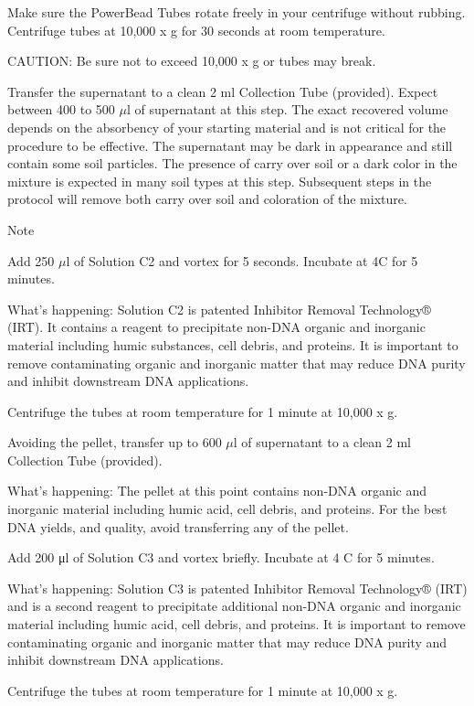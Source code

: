 \documentclass[12pt]{../SOP3_alpha}
\begin{document}
\NP Make sure the PowerBead Tubes rotate freely in your centrifuge without rubbing. Centrifuge tubes at 10,000 x g for 30 seconds at room temperature.

CAUTION: Be sure not to exceed 10,000 x g or tubes may break.

\NP Transfer the supernatant to a clean 2 ml Collection Tube (provided). Expect between 400 to 500 $\mu$l of supernatant at this step. The exact recovered volume depends on the absorbency of
your starting material and is not critical for the procedure to be effective. The supernatant may be dark in appearance and still contain some soil particles. The presence of carry over soil or a dark color in the mixture is expected in many
soil types at this step. Subsequent steps in the protocol will remove both carry over soil and coloration of the mixture.

Note

\NP Add 250 $\mu$l of Solution C2 and vortex for 5 seconds. Incubate at 4\degree C for 5
minutes.

What's happening: Solution C2 is patented Inhibitor Removal Technology® (IRT). It contains a reagent to precipitate non-DNA organic and inorganic material including humic substances, cell debris, and proteins. It is important to remove contaminating organic and inorganic matter that may reduce
DNA purity and inhibit downstream DNA applications.

\NP Centrifuge the tubes at room temperature for 1 minute at 10,000 x g.

\NP Avoiding the pellet, transfer up to 600 $\mu$l of supernatant to a clean 2 ml Collection Tube (provided).

What's happening: The pellet at this point contains non-DNA organic and inorganic material including humic acid, cell debris, and proteins. For the
best DNA yields, and quality, avoid transferring any of the pellet.

\NP Add 200 μl of Solution C3 and vortex briefly. Incubate at 4 \degree C for 5 minutes.

What's happening: Solution C3 is patented Inhibitor Removal Technology® (IRT) and is a second reagent to precipitate additional non-DNA organic
and inorganic material including humic acid, cell debris, and proteins. It is important to remove contaminating organic and inorganic matter that may
reduce DNA purity and inhibit downstream DNA applications.

\NP Centrifuge the tubes at room temperature for 1 minute at 10,000 x g.
\end{document}
